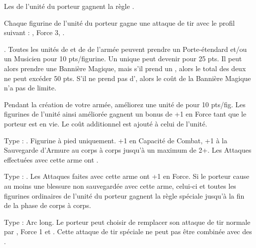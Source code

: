 \begin{multicols}{2}
 Les \dryads{} de l'unité du porteur gagnent la règle \hatred{}.

Chaque figurine de l'unité du porteur gagne une attaque de tir avec le profil suivant : , Force 3, .

. Toutes les unités de \dryads et de \thicketbeasts{} de l'armée peuvent prendre un Porte-étendard et/ou un Musicien pour 10 pts/figurine. Un unique \thicketshepherd{} peut devenir \bsb{} pour 25 pts. Il peut alors prendre une Bannière Magique, mais s'il prend un \aspectofnature{}, alors le total des deux ne peut excéder 50 pts. S'il ne prend pas d'\aspectofnature{}, alors le coût de la Bannière Magique n'a pas de limite.

Pendant la création de votre armée, améliorez une unité de \thicketbeasts{} pour 10 pts/fig. Les figurines de l'unité ainsi améliorée gagnent un bonus de +1 en Force  tant que le porteur est en vie. Le coût additionnel est ajouté à celui de l'unité.

\endpricelistNSP
\end{multicols}

\closearmynewsection

\startarmymagicalitems

\armymagicalweapons

\startpricelist

Type : \gw{}. Figurine à pied uniquement. +1 en Capacité de Combat, +1 à la Sauvegarde d'Armure au corps à corps jusqu'à un maximum de 2+. Les Attaques effectuées avec cette arme ont .

Type : \spear{}. Les Attaques faites avec cette arme ont +1 en Force. Si le porteur cause au moins une blessure non sauvegardée avec cette arme, celui-ci et toutes les figurines ordinaires de l'unité du porteur gagnent la règle spéciale \distracting{} jusqu'à la fin de la phase de corps à corps.

Type : Arc long. Le porteur peut choisir de remplacer son attaque de tir normale par , Force 1 et \poisonedattacks{}. Cette attaque de tir spéciale ne peut pas être combinée avec des \feyarrows{}.

\endpricelist

\armymagicalarmour

